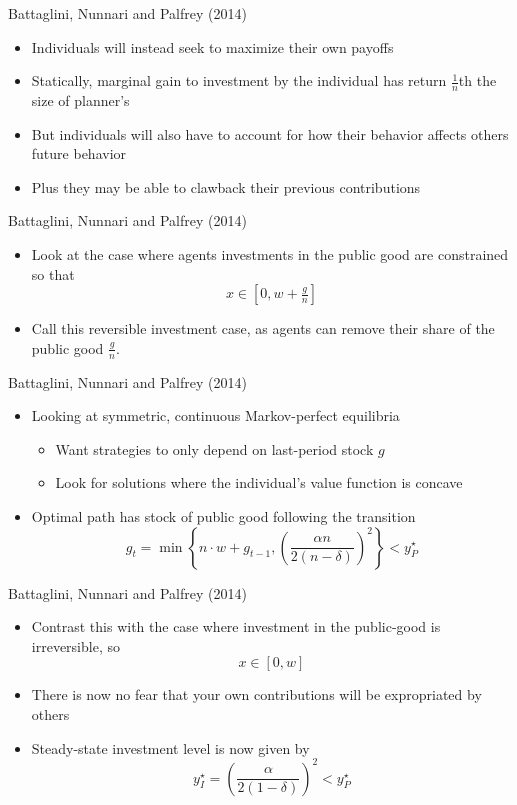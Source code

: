 \documentclass{beamer}
\begin{document}
\begin{frame}{Battaglini, Nunnari and Palfrey (2014)}
	\begin{itemize}
		\item Individuals will instead seek to maximize their own payoffs
		\item Statically, marginal gain to investment by the individual has return $\tfrac{1}{n}$th the size of planner's \pause
		\item But individuals will also have to account for how their behavior affects others future behavior\pause
		\item Plus they may be able to clawback their previous contributions
	\end{itemize}
\end{frame}

\begin{frame}{Battaglini, Nunnari and Palfrey (2014)}
	\begin{itemize}
		\item Look at the case where agents investments in the public good are constrained so that
		$$ x\in\left[0,w+\tfrac{g}{n}\right] $$
		\item Call this reversible investment case, as agents can remove their share of the public good $\tfrac{g}{n}$.
	\end{itemize}
\end{frame}

\begin{frame}{Battaglini, Nunnari and Palfrey (2014)}
	\begin{itemize}
		\item Looking at symmetric, continuous Markov-perfect equilibria
		\begin{itemize}
			\item Want strategies to only depend on last-period stock $g$
			\item Look for solutions where the individual's value function is concave
		\end{itemize}\pause
		\item Optimal path has stock of public good following the transition
			$$g_t=\min\left\{n\cdot w+g_{t-1} , \left(\dfrac{\alpha n}{2(n-\delta)}\right)^2  \right\}<y^\star_P $$
	\end{itemize}
\end{frame}

\begin{frame}{Battaglini, Nunnari and Palfrey (2014)}
	\begin{itemize}
		\item Contrast this with the case where investment in the public-good is irreversible, so
		$$x\in\left[0,w\right]$$ \pause
		\item There is now no fear that your own contributions will be expropriated by others
		\pause
		\item Steady-state investment level is now given by $$y^\star_I=\left(\dfrac{\alpha}{2(1-\delta)}\right)^2<y^\star_P$$
	\end{itemize}
\end{frame}
\end{document}
